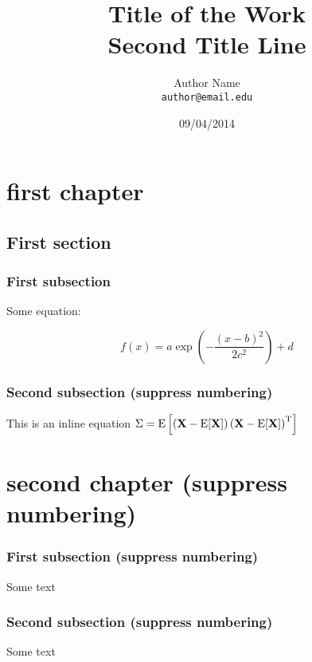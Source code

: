 \documentclass{report}
\title{Title of the Work\\ Second Title Line}
\author{Author Name\\ \texttt{author@email.edu}}
\date{09\slash 04\slash 2014}
\begin{document}

\maketitle %



\chapter{first chapter}

\section{First section}

\subsection{First subsection}

Some equation:

\begin{equation} f(x) = a \exp{\left(- { \frac{(x-b)^2 }{ 2 c^2} } \right)}+d \end{equation}




\subsection*{Second subsection (suppress numbering)}

This is an inline equation 
$\Sigma=\mathrm{E}
\left[
 \left(
 \textbf{X} - \mathrm{E}[\textbf{X}]
 \right)
 \left(
 \textbf{X} - \mathrm{E}[\textbf{X}]
 \right)^{\rm T}
\right]$

\newpage


\chapter*{second chapter (suppress numbering)}

\subsection*{First subsection (suppress numbering)}

Some text


\subsection*{Second subsection (suppress numbering)}

Some text
\end{document}
